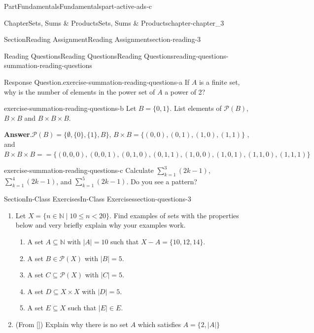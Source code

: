 \documentclass[oneside,10pt,]{book}
\newcommand{\blocktitlefont}{\relax}
\newcommand{\xreffont}{\relax}
\numberwithin{equation}{section}
\newcommand{\card}[1]{\left| #1 \right|}
\newcommand{\lt}{<}
\begin{document}
\begin{partptx}{Part}{Fundamentals}{}{Fundamentals}{}{}{part-active-ads-c}
\begin{chapterptx}{Chapter}{Sets, Sums \& Products}{}{Sets, Sums \& Products}{}{}{chapter-chapter_3}
\begin{sectionptx}{Section}{Reading Assignment}{}{Reading Assignment}{}{}{section-reading-3}
\begin{reading-questions-subsection-numberless}{Reading Questions}{Reading Questions}{}{Reading Questions}{}{}{reading-questions-summation-reading-questions}
\begin{divisionexercise}{1}{Response Question.}{}{exercise-summation-reading-questions-a}
If \(A\) is a finite set, why is the number of elements in the power set of \(A\) a power of 2?%
\end{divisionexercise}%
\begin{divisionexercise}{2}{}{}{exercise-summation-reading-questions-b}%
Let \(B=\{0,1\}\).  List elements of  \(\mathcal{P}(B)\),  \(B\times B\) and \(B\times B\times B\).%
\par\smallskip%
\noindent\textbf{\blocktitlefont Answer}.\hypertarget{answer-summation-reading-questions-b-b}{}\quad{}\(\mathcal{P}(B)=\{\emptyset,\{0\},\{1\},B\}\),  \(B\times B=\{(0,0),(0,1),(1,0),(1,1)\}\) , and \(B\times B\times B==\{(0,0,0),(0,0,1),(0,1,0),(0,1,1),(1,0,0),(1,0,1),(1,1,0),(1,1,1)\}\)%
\end{divisionexercise}%
\begin{divisionexercise}{3}{}{}{exercise-summation-reading-questions-c}%
Calculate \(\sum_{k=1}^3 (2k-1)\), \(\sum_{k=1}^4 (2k-1)\), and \(\sum_{k=1}^5 (2k-1)\). Do you see a pattern?%
\end{divisionexercise}%
\end{reading-questions-subsection-numberless}
\end{sectionptx}
%
%
\typeout{************************************************}
\typeout{************************************************}
%
\begin{sectionptx}{Section}{In-Class Exercises}{}{In-Class Exercises}{}{}{section-questions-3}
%
\begin{enumerate}[label=\arabic*.]
\item{}Let \(X = \{n \in \mathbb{N} \mid 10 \leq n \lt 20\}\).  Find examples of sets with the properties below and very briefly explain why your examples work.%
\begin{enumerate}[label=(\alph*)]
\item{}A set \(A \subseteq \mathbb{N}\) with \(\lvert A \rvert = 10\) such that \(X - A = \{10, 12, 14\}\).%
\item{}A set \(B \in \mathcal{P}(X)\) with \(\lvert B\rvert = 5\).%
\item{}A set \(C \subseteq \mathcal{P}(X)\) with \(\lvert C\rvert = 5\).%
\item{}A set \(D \subseteq X \times X\) with \(\lvert D\rvert = 5\).%
\item{}A set \(E \subseteq X\) such that \(\lvert E\rvert \in E\).%
\end{enumerate}
%
\item{}(From \hyperlink{biblio-biblio-levin-2020}{[{\xreffont 3}]}) Explain why there is no set \(A\) which satisfies \(A = \{2, \card{A}\}\)%

\end{enumerate}
\end{sectionptx}
\end{chapterptx}
\end{partptx}
\end{document}
